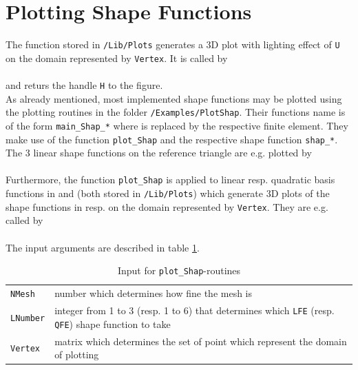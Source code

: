 \section{Plotting Shape Functions} \label{sect:shap_plot}  

 The function  stored in {\tt /Lib/Plots} generates a 3D plot with lighting effect of {\tt U} on the domain represented by {\tt Vertex}. It is called by \\

 \\

 and returs the handle {\tt H} to the figure. \\

 As already mentioned, most implemented shape functions may be plotted using the plotting routines in the folder {\tt /Examples/PlotShap}. Their functions name is of the form {\tt main\_Shap\_*} where {\tt *} is replaced by the respective finite element. They make use of the function {\tt plot\_Shap} and the respective shape function {\tt shap\_*}. The 3 linear shape functions on the reference triangle are e.g. plotted by \\

 \\

 Furthermore, the function {\tt plot\_Shap} is applied to linear resp. quadratic basis functions in  and  (both stored in {\tt /Lib/Plots}) which generate 3D plots of the shape functions in  resp.  on the domain represented by {\tt Vertex}. They are e.g. called by \\

 \\

 The input arguments are described in table \ref{tab:plot_shap_in}.

\begin{table}[htb]
  \begin{tabular}{p{2cm}p{9cm}}
    {\tt NMesh} & {\small number which determines how fine the mesh is} \\
    {\tt LNumber} & {\small integer from 1 to 3 (resp. 1 to 6) that determines which {\tt LFE} (resp. {\tt QFE}) shape function to take} \\
    {\tt Vertex} & {\small matrix which determines the set of point which represent the domain of plotting}
  \end{tabular}
  \caption{Input for {\tt plot\_Shap}-routines}
  \label{tab:plot_shap_in}
\end{table}

